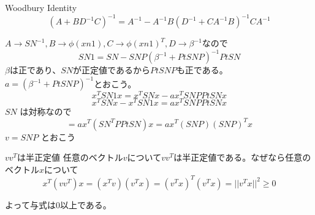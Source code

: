 \documentclass[a4paper]{jsarticle}
\newcommand{\inv}{^{-1}}
\begin{document}
\begin{itembox}[l]{Woodbury Identity}
\[ (A + B D\inv C)\inv = A\inv - A\inv B (D\inv + C A\inv B)\inv C A\inv \]
\end{itembox}

$A \to SN\inv, B \to \phi(xn1), C \to \phi(xn1)^T, D \to \beta\inv$なので
\[ SN1 = SN - SN P (\beta\inv + Pt SN P)\inv Pt SN \]
$\beta$は正であり、$SN$が正定値であるから$Pt SN P$も正である。$a = (\beta\inv + Pt SN P)\inv$とおこう。
\[ x^T SN1 x = x^T SN x - a x^T SN P Pt SN x\]
\[ x^T SN x - x^T SN1 x = a x^T SN P Pt SN x\]
$SN$ は対称なので
\[ = a x^T (SN^T P Pt SN) x = a x^T (SN P) (SN P)^T x \]
$v = SN P$ とおこう
\begin{itembox}[l]{$vv^T$は半正定値}
任意のベクトル$v$について$vv^T$は半正定値である。なぜなら任意のベクトル$x$について
\[ x^T (vv^T) x = (x^Tv)(v^Tx) = (v^Tx)^T(v^Tx) = ||v^Tx||^2  \ge 0\]

\end{itembox}

よって与式は0以上である。
\end{document}
